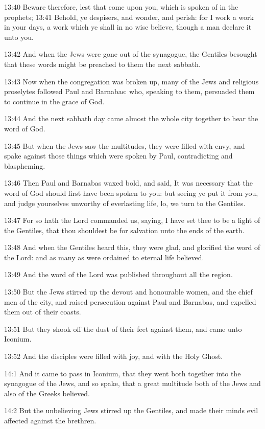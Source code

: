 13:40 Beware therefore, lest that come upon you, which is spoken of in the prophets; 13:41 Behold, ye despisers, and wonder, and perish: for I work a work in your days, a work which ye shall in no wise believe, though a man declare it unto you.

13:42 And when the Jews were gone out of the synagogue, the Gentiles besought that these words might be preached to them the next sabbath.

13:43 Now when the congregation was broken up, many of the Jews and religious proselytes followed Paul and Barnabas: who, speaking to them, persuaded them to continue in the grace of God.

13:44 And the next sabbath day came almost the whole city together to hear the word of God.

13:45 But when the Jews saw the multitudes, they were filled with envy, and spake against those things which were spoken by Paul, contradicting and blaspheming.

13:46 Then Paul and Barnabas waxed bold, and said, It was necessary that the word of God should first have been spoken to you: but seeing ye put it from you, and judge yourselves unworthy of everlasting life, lo, we turn to the Gentiles.

13:47 For so hath the Lord commanded us, saying, I have set thee to be a light of the Gentiles, that thou shouldest be for salvation unto the ends of the earth.

13:48 And when the Gentiles heard this, they were glad, and glorified the word of the Lord: and as many as were ordained to eternal life believed.

13:49 And the word of the Lord was published throughout all the region.

13:50 But the Jews stirred up the devout and honourable women, and the chief men of the city, and raised persecution against Paul and Barnabas, and expelled them out of their coasts.

13:51 But they shook off the dust of their feet against them, and came unto Iconium.

13:52 And the disciples were filled with joy, and with the Holy Ghost.

14:1 And it came to pass in Iconium, that they went both together into the synagogue of the Jews, and so spake, that a great multitude both of the Jews and also of the Greeks believed.

14:2 But the unbelieving Jews stirred up the Gentiles, and made their minds evil affected against the brethren.

